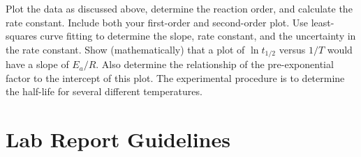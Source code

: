 Plot the data as discussed above, determine the reaction order, and calculate the rate constant. 
Include both your first-order and second-order plot. 
Use least-squares curve fitting to determine the slope, rate constant, and the uncertainty in the rate constant.
Show (mathematically) that a plot of \(\ln{t_{1/2}}\) versus \(1/T\) would have a slope of \(E_a/R\). 
Also determine the relationship of the pre-exponential factor to the intercept of this plot. 
The experimental procedure is to determine the half-life for several different temperatures.

\section{Lab Report Guidelines} %
\label{sec:lab_report_guidelines}

